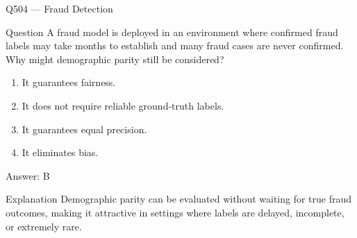 \documentclass[aspectratio=169,8pt]{beamer}
\begin{document}
\begin{frame}{Q504 --- Fraud Detection}
	\begin{block}{Question}
		A fraud model is deployed in an environment where confirmed fraud labels may take months to establish and many fraud cases are never confirmed. Why might demographic parity still be considered?
		\begin{enumerate}
			\item It guarantees fairness.
			\item It does not require reliable ground-truth labels.
			\item It guarantees equal precision.
			\item It eliminates bias.
		\end{enumerate}
	\end{block}
	\begin{exampleblock}{Answer: B}\end{exampleblock}
	\begin{block}{Explanation}
		Demographic parity can be evaluated without waiting for true fraud outcomes, making it attractive in settings where labels are delayed, incomplete, or extremely rare.
	\end{block}
\end{frame}
\end{document}
